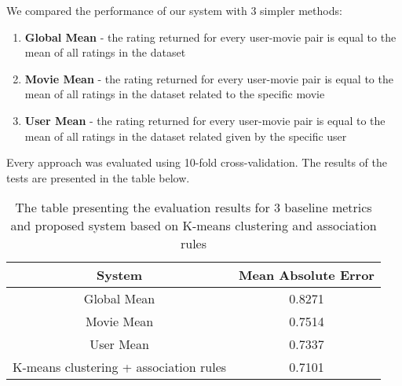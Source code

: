 We compared the performance of our system with 3 simpler methods:

\begin{enumerate}
    \item \textbf{Global Mean} - the rating returned for every user-movie pair is equal to the mean of all ratings in the dataset
    \item \textbf{Movie Mean} -  the rating returned for every user-movie pair is equal to the mean of all ratings in the dataset related to the specific movie
    \item \textbf{User Mean} - the rating returned for every user-movie pair is equal to the mean of all ratings in the dataset related given by the specific user
\end{enumerate}

Every approach was evaluated using 10-fold cross-validation. The results of the tests are presented in the table below.

\begin{table}[h]
\centering
\begin{tabular}{|c|c|}
\hline
System                                & Mean Absolute Error \\ \hline
Global Mean                           & 0.8271              \\ \hline
Movie Mean                            & 0.7514              \\ \hline
User Mean                             & 0.7337          \\ \hline
K-means clustering + association rules & 0.7101              \\ \hline
\end{tabular}
\caption{The table presenting the evaluation results for 3 baseline metrics and proposed system based on K-means clustering and association rules}
\label{tab:my-table}
\end{table}
